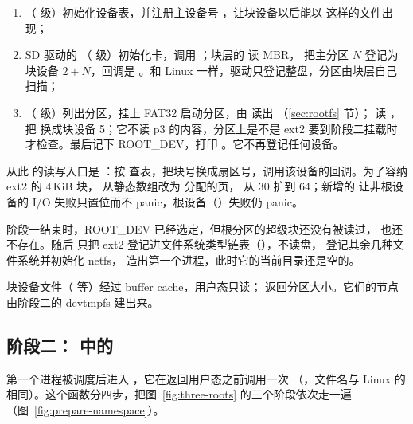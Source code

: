 \begin{enumerate}
  \item {}（ 级）初始化设备表，并注册主设备号 ，让块设备以后能以  这样的文件出现；
  \item SD 驱动的 （ 级）初始化卡，调用 ；块层的  读 MBR， 把主分区 $N$ 登记为块设备 $2+N$，回调是 。和 Linux 一样，驱动只登记整盘，分区由块层自己扫描；
  \item {}（ 级）列出分区，挂上 FAT32 启动分区，由  读出 （\ref{sec:rootfs} 节）； 读 ， 把  换成块设备 5；它不读 p3 的内容，分区上是不是 ext2 要到阶段二挂载时才检查。最后记下 ROOT\_DEV，打印 。它不再登记任何设备。
\end{enumerate}

从此  的读写入口是 ：按  查表，把块号换成扇区号，调用该设备的回调。为了容纳 ext2 的 4\,KiB 块， 从静态数组改为  分配的页， 从 30 扩到 64；新增的  让非根设备的 I/O 失败只置位而不 panic，根设备（）失败仍 panic。

阶段一结束时，ROOT\_DEV 已经选定，但根分区的超级块还没有被读过，\code{/} 也还不存在。随后  只把 ext2 登记进文件系统类型链表（），不读盘， 登记其余几种文件系统并初始化 netfs， 造出第一个进程，此时它的当前目录还是空的。

\begin{note}
  块设备文件（ 等）经过 buffer cache，用户态只读； 返回分区大小。它们的节点由阶段二的 devtmpfs 建出来。
\end{note}

\subsection{阶段二： 中的 }
\label{sec:ns-stage2}

第一个进程被调度后进入 ，它在返回用户态之前调用一次 （，文件名与 Linux 的  相同）。这个函数分四步，把图~\ref{fig:three-roots} 的三个阶段依次走一遍（图~\ref{fig:prepare-namespace}）。

